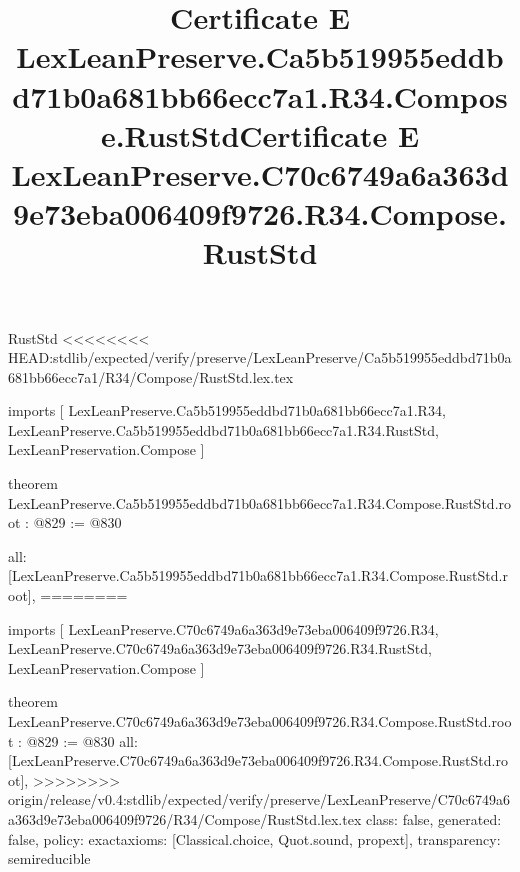 \begin{lexlean}{RustStd}
<<<<<<<< HEAD:stdlib/expected/verify/preserve/LexLeanPreserve/Ca5b519955eddbd71b0a681bb66ecc7a1/R34/Compose/RustStd.lex.tex
\title{Certificate E LexLeanPreserve.Ca5b519955eddbd71b0a681bb66ecc7a1.R34.Compose.RustStd}
\begin{coremodule}
imports [
  LexLeanPreserve.Ca5b519955eddbd71b0a681bb66ecc7a1.R34,
  LexLeanPreserve.Ca5b519955eddbd71b0a681bb66ecc7a1.R34.RustStd,
  LexLeanPreservation.Compose
]

theorem LexLeanPreserve.Ca5b519955eddbd71b0a681bb66ecc7a1.R34.Compose.RustStd.root : @829 := @830 {
  all: [LexLeanPreserve.Ca5b519955eddbd71b0a681bb66ecc7a1.R34.Compose.RustStd.root],
========
\title{Certificate E LexLeanPreserve.C70c6749a6a363d9e73eba006409f9726.R34.Compose.RustStd}
\begin{coremodule}
imports [
  LexLeanPreserve.C70c6749a6a363d9e73eba006409f9726.R34,
  LexLeanPreserve.C70c6749a6a363d9e73eba006409f9726.R34.RustStd,
  LexLeanPreservation.Compose
]

theorem LexLeanPreserve.C70c6749a6a363d9e73eba006409f9726.R34.Compose.RustStd.root : @829 := @830 {
  all: [LexLeanPreserve.C70c6749a6a363d9e73eba006409f9726.R34.Compose.RustStd.root],
>>>>>>>> origin/release/v0.4:stdlib/expected/verify/preserve/LexLeanPreserve/C70c6749a6a363d9e73eba006409f9726/R34/Compose/RustStd.lex.tex
  class: false,
  generated: false,
  policy: exact{axioms: [Classical.choice, Quot.sound, propext]},
  transparency: semireducible
}


\end{coremodule}}
\end{coremodule}
\end{lexlean}
